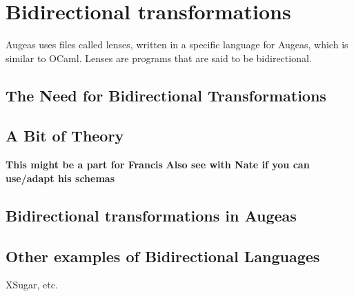\chapter{Bidirectional transformations}

\label{chap:bx}

Augeas uses files called lenses, written in a specific language for Augeas, which is similar to OCaml. Lenses are programs that are said to be bidirectional.

\section{The Need for Bidirectional Transformations}


\section{A Bit of Theory}

\textbf{This might be a part for Francis}
\textbf{Also see with Nate if you can use/adapt his schemas}

\section{Bidirectional transformations in Augeas}

\section{Other examples of Bidirectional Languages}

XSugar, etc.

